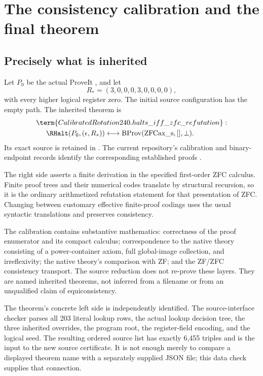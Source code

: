\section{The consistency calibration and the final theorem}
\label{sec:consistency}

\subsection{Precisely what is inherited}

Let $P_0$ be the actual ProveIt
, and let
\[
 R_*=(3,0,0,0,3,0,0,0,0),
\]
with every higher logical register zero. The initial source
configuration has the empty path. The inherited theorem is
\begin{align}
 &\term{CalibratedRotation240.halts\_iff\_zfc\_refutation}:\notag\\
 &\hspace{5mm}
 \RHalt(P_0,(\epsilon,R_*))
 \longleftrightarrow
 \operatorname{BProv}(\mathrm{ZFCax\_s},[],\bot).
 \label{eq:calibration}
\end{align}
Its exact source is retained in
.
The current repository's calibration and binary-endpoint records
identify the corresponding established proofs
\cite{calibration,rotation240}.

The right side asserts a finite derivation in the specified
first-order ZFC calculus. Finite proof trees and their numerical
codes translate by structural recursion, so it is the ordinary
arithmetized refutation statement for that presentation of ZFC.
Changing between customary effective finite-proof codings uses
the usual syntactic translations and preserves consistency.

The calibration contains substantive mathematics: correctness of
the proof enumerator and its compact calculus; correspondence to
the native theory consisting of a power-container axiom, full
global-image collection, and irreflexivity; the native theory's
comparison with ZF; and the ZF/ZFC consistency transport.
The source reduction does not re-prove these layers. They are
named inherited theorems, not inferred from a filename or from
an unqualified claim of equiconsistency.

The theorem's concrete left side is independently identified.
The source-interface checker parses all 203 literal lookup rows,
the actual lookup decision tree, the three inherited overrides,
the program root, the register-field encoding, and the logical
seed. The resulting ordered source list has exactly 6,455
triples and is the input to the new source certificate.
It is not enough merely to compare a displayed theorem name
with a separately supplied JSON file; this data check supplies
that connection.

